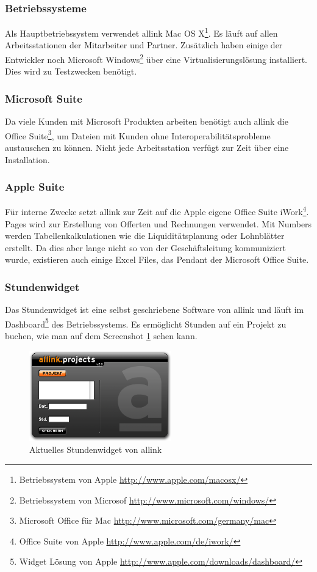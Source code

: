 \subsubsection{Betriebssysteme}
Als Hauptbetriebssystem verwendet allink Mac OS X\footnote{Betriebssystem von Apple \url{http://www.apple.com/macosx/}}.
Es läuft auf allen Arbeitsstationen der Mitarbeiter und Partner. Zusätzlich haben einige der
Entwickler noch Microsoft Windows\footnote{Betriebssystem von Microsof \url{http://www.microsoft.com/windows/}}
über eine Virtualisierungslösung installiert. Dies wird zu Testzwecken benötigt.

\subsubsection{Microsoft Suite}
Da viele Kunden mit Microsoft Produkten arbeiten benötigt auch allink die
Office Suite\footnote{Microsoft Office für Mac \url{http://www.microsoft.com/germany/mac}}, 
um Dateien mit Kunden ohne Interoperabilitätsprobleme
austauschen zu können. Nicht jede Arbeitsstation verfügt zur Zeit über eine
Installation.

\subsubsection{Apple Suite}
Für interne Zwecke setzt allink zur Zeit auf die Apple eigene Office Suite
iWork\footnote{Office Suite von Apple \url{http://www.apple.com/de/iwork/}}.
Pages wird zur Erstellung von Offerten und Rechnungen verwendet. Mit Numbers
werden Tabellenkalkulationen wie die Liquiditätsplanung oder Lohnblätter erstellt.
Da dies aber lange nicht so von der Geschäftsleitung kommuniziert wurde, existieren
auch einige Excel Files, das Pendant der Microsoft Office Suite.

\subsubsection{Stundenwidget}
Das Stundenwidget ist eine selbst geschriebene Software von allink und läuft
im Dashboard\footnote{Widget Lösung von Apple \url{http://www.apple.com/downloads/dashboard/}} des Betriebssystems.
Es ermöglicht Stunden auf ein Projekt zu buchen, wie man auf dem Screenshot \ref{pic:ist_widget}
sehen kann.

\begin{figure}[htbp]
\begin{center}
\includegraphics[width=0.55\textwidth,angle=0]{./bilder/ist_widget.png}
\caption{Aktuelles Stundenwidget von allink}
\label{pic:ist_widget}
\end{center}
\end{figure}

